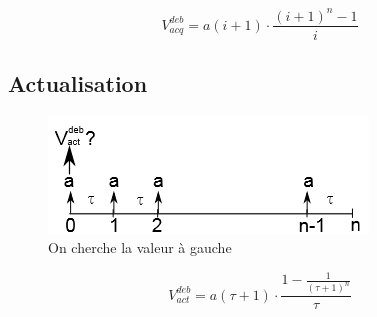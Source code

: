 \documentclass{article}
\begin{document}
$$\boxed{V^{deb}_{acq} = a(i+1)\cdot\dfrac{(i+1)^n-1}{i}}$$

\subsection{Actualisation}

\begin{figure}[H]
    \centering
    \includegraphics{versement-constant-actu.png}
    \\On cherche la valeur à gauche
\end{figure}

$$\boxed{V^{deb}_{act} = a(\tau+1)\cdot\dfrac{1-\frac{1}{(\tau+1)^n}}{\tau}}$$
\end{document}
